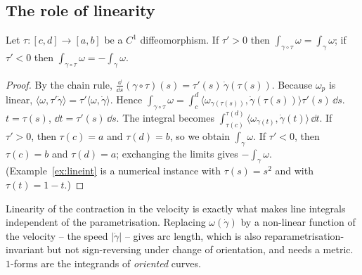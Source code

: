 \subsection{The role of linearity}\label{sec:linearity}

\begin{proposition}\label{prop:reparam}
Let $\tau:[c,d]\to[a,b]$ be a $C^1$ diffeomorphism. If $\tau'>0$ then $\int_{\gamma\circ\tau}\omega=\int_\gamma\omega$; if $\tau'<0$ then $\int_{\gamma\circ\tau}\omega=-\int_\gamma\omega$.
\end{proposition}
\begin{proof}
 By the chain rule, $\frac{\dd}{\dd s}(\gamma\circ\tau)(s)=\tau'(s)\,\dot\gamma(\tau(s))$.
 Because $\omega_p$ is linear, $\langle\omega,\tau'\dot\gamma\rangle=\tau'\langle\omega,\dot\gamma\rangle$. Hence $\int_{\gamma\circ\tau}\omega=\int_c^d\langle\omega_{\gamma(\tau(s))},\dot\gamma(\tau(s))\rangle\tau'(s)\,\dd s$.
 $t=\tau(s)$, $\dd t=\tau'(s)\,\dd s$. The integral becomes $\int_{\tau(c)}^{\tau(d)}\langle\omega_{\gamma(t)},\dot\gamma(t)\rangle\,\dd t$.
 If $\tau'>0$, then $\tau(c)=a$ and $\tau(d)=b$, so we obtain $\int_\gamma\omega$. If $\tau'<0$, then $\tau(c)=b$ and $\tau(d)=a$; exchanging the limits gives $-\int_\gamma\omega$.
(Example~\ref{ex:lineint} is a numerical instance with $\tau(s)=s^2$ and with $\tau(t)=1-t$.)
\end{proof}

\begin{keyidea}
Linearity of the contraction in the velocity is exactly what makes line integrals independent of the parametrisation. Replacing $\omega(\dot\gamma)$ by a non-linear function of the velocity -- \eg the speed $|\dot\gamma|$ -- gives arc length,
which is also reparametrisation-invariant but not sign-reversing under change of orientation, and needs a metric. $1$-forms are the integrands of \emph{oriented} curves.
\end{keyidea}
